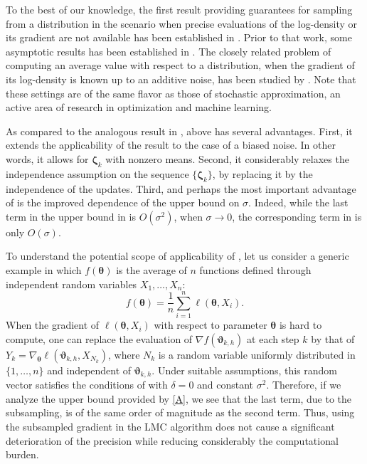 \documentclass[aoap,preprint,reqno,a4paper]{imsart} %
\newcommand{\bzeta}{\boldsymbol{\zeta}}
\newcommand{\btheta}{\boldsymbol{\theta}}
\newcommand{\bvartheta}{\boldsymbol{\vartheta}}
\begin{document}
To the best of our knowledge, the first result providing guarantees for sampling from a
distribution in the scenario when precise evaluations of the log-density or its gradient are
not available has been established in \citep{DalalyanColt}. Prior to that work, some asymptotic
results has been established in \citep{Alquier2016}. The closely related problem of computing an
average value with respect to a distribution, when the gradient of its log-density is known up to
an additive noise, has been studied by \cite{teh16a,Vollmer2015,Nagapetyan}. Note that these
settings are of the same flavor as those of stochastic approximation, an active area of research
in optimization and machine learning.

As compared to the analogous result in \citep{DalalyanColt},  above has several
advantages. First, it extends the applicability of the result to the case of a biased noise.
In other words, it allows for $\bzeta_k$ with nonzero means. Second, it considerably relaxes
the independence assumption on the sequence $\{\bzeta_k\}$, by replacing it by the independence
of the updates. Third, and perhaps the most important advantage of  is the improved
dependence of the upper bound on $\sigma$. Indeed, while the last term in the upper bound in 
is $O(\sigma^2)$, when $\sigma\to 0$, the corresponding term in \citep[Th.\ 3]{DalalyanColt} is
only $O(\sigma)$.


To understand the potential scope of applicability of , let us consider a generic example
in which $f(\btheta)$ is the average of $n$ functions defined through independent
random variables $X_1,\ldots,X_n$:
$$
f(\btheta) = \frac1n\sum_{i=1}^n \ell(\btheta,X_i).
$$
When the gradient of $\ell(\btheta,X_i)$ with respect to parameter $\btheta$ is hard to compute,
one can replace the evaluation of $\nabla f(\bvartheta_{k,h})$ at each step $k$ by that  of $Y_k=
\nabla_{\btheta} \ell (\bvartheta_{k,h},X_{N_k})$, where $N_k$
is a random variable uniformly distributed in $\{1,\ldots, n\}$ and
independent of $\bvartheta_{k,h}$. Under suitable assumptions, this random
vector satisfies the conditions of  with $\delta = 0$ and constant $\sigma^2$.
Therefore, if we analyze the upper bound provided by \eqref{A}, we see that the
last term, due to the subsampling, is of the same order of magnitude as the second term.
Thus, using the subsampled gradient in the LMC algorithm does not cause a significant
deterioration of the precision while reducing considerably the computational burden.
\end{document}
